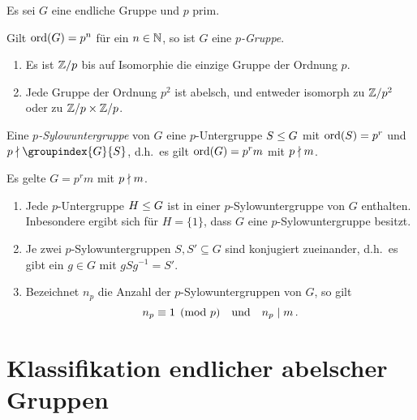 Es sei $G$ eine endliche Gruppe und $p$ prim.

\begin{definition}
  Gilt $\operatorname{ord}(G) = p^n$ für ein $n \in \mathbb{N}$, so ist $G$ eine \emph{$p$-Gruppe}.
\end{definition}

\begin{example}
  \begin{enumerate}
    \item
      Es ist $\mathbb{Z}/p$ bis auf Isomorphie die einzige Gruppe der Ordnung $p$.
    \item
      Jede Gruppe der Ordnung $p^2$ ist abelsch, und entweder isomorph zu $\mathbb{Z}/p^2$ oder zu $\mathbb{Z}/p \times \mathbb{Z}/p$.
  \end{enumerate}
\end{example}


\begin{definition}
  Eine \emph{$p$-Sylow\-unter\-gruppe} von $G$ eine $p$-Untergruppe $S \mathrel{\leq} G$ mit $\operatorname{ord}(S) = p^r$ und $p \notdivides \groupindex{G}{S}$, d.h.\ es gilt $\operatorname{ord}(G) = p^r m$ mit $p \mathrel{\nmid} m$.
\end{definition}

\begin{theorem}[Sylowsätze]
  Es gelte $G = p^r m$ mit $p \mathrel{\nmid} m$.
  \begin{enumerate}
    \item
      Jede $p$-Untergruppe $H \mathrel{\leq} G$ ist in einer $p$-Sylowuntergruppe von $G$ enthalten.
      Inbesondere ergibt sich für $H = \{1\}$, dass $G$ eine $p$-Sylowuntergruppe besitzt.
    \item
      Je zwei $p$-Sylowuntergruppen $S, S' \subseteq G$ sind konjugiert zueinander, d.h.\ es gibt ein $g \in G$ mit $g S g^{-1} = S'$.
    \item
      Bezeichnet $n_p$ die Anzahl der $p$-Sylowuntergruppen von $G$, so gilt
      \[
                n_p
        \equiv  1
        \pmod{p}
        \quad\text{und}\quad
        n_p \mathrel{|} m \,.
      \]

  \end{enumerate}
\end{theorem}



\section{Klassifikation endlicher abelscher Gruppen}

